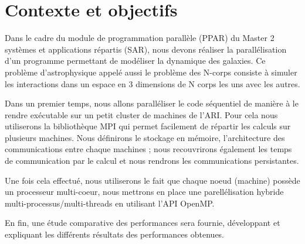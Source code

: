 \section{Contexte et objectifs}
\par Dans le cadre du module de programmation parallèle (PPAR)
du Master 2 systèmes et applications répartis (SAR), nous devons réaliser
la parallélisation d'un programme permettant de modéliser la dynamique des galaxies.
Ce problème d'astrophysique appelé aussi le problème des N-corps consiste à 
simuler les interactions dans un espace en 3 dimensions de N corps les uns avec
les autres.\\
\par Dans un premier temps, nous allons paralléliser le code séquentiel de manière 
à le rendre exécutable sur un petit cluster de machines de l'ARI. Pour cela nous 
utiliserons la bibliothèque MPI qui permet facilement de répartir les calculs sur 
plusieurs machines. Nous définirons le stockage en mémoire, l'architecture des
communications entre chaque machines ; nous recouvrirons également les temps de 
communication par le calcul et nous rendrons les communications persistantes.\\
\par Une fois cela effectué, nous utiliserons le fait que chaque noeud (machine)
possède un processeur multi-coeur, nous mettrons en place une parellélisation hybride
multi-processus/multi-threads en utilisant l'API OpenMP.\\
\par En fin, une étude comparative des performances sera fournie,
développant et expliquant les différents résultats des performances obtenues.\\
